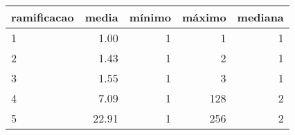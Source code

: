\begin{table}[ht]
\centering
\begin{tabular}{lrrrr}
  \hline
ramificacao & media & mínimo & máximo & mediana \\ 
  \hline
1 & 1.00 &   1 &   1 &   1 \\ 
  2 & 1.43 &   1 &   2 &   1 \\ 
  3 & 1.55 &   1 &   3 &   1 \\ 
  4 & 7.09 &   1 & 128 &   2 \\ 
  5 & 22.91 &   1 & 256 &   2 \\ 
   \hline
\end{tabular}
\end{table}
